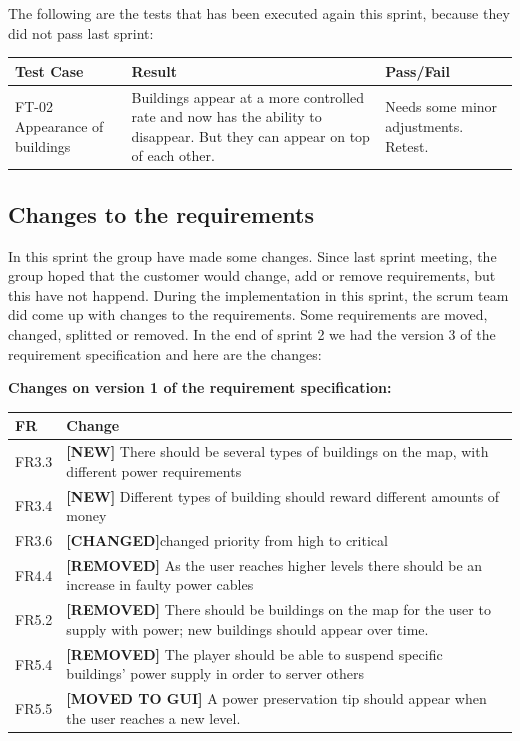 	The following are the tests that has been executed again this sprint, because they did not pass last sprint:

	\begin{tabular}{| p{2cm} | p{7cm} | p{3cm} |}
		\hline
		\rowcolor{lightgray}
		{\bf Test Case} & {\bf Result} & {\bf Pass/Fail} \\ \hline

		FT-02 Appearance of buildings & Buildings appear at a more controlled rate and now has the ability to disappear. But they can appear on top of each other. & Needs some minor adjustments. Retest. \\ \hline

	\end{tabular}

\subsection{Changes to the requirements}
	In this sprint the group have made some changes. Since last sprint meeting, 
	the group hoped that the customer would change, add or remove requirements, 
	but this have not happend. During the implementation in this sprint, the 
	scrum team did come up with changes to the requirements. 
	Some requirements are moved, changed, splitted or removed.
	In the end of sprint 2 we had the version 3 of the requirement specification 
	and here are the changes:


	{\bf Changes on version 1 of the requirement specification:} \\
	\begin{tabular}{| p{1.5cm} | p{12cm} |}
		\hline
		\rowcolor{lightgray}
		{\bf FR} & {\bf Change} \\ \hline
		FR3.3 & {\bf \color{green} [NEW]} There should be several types of buildings on the map, 
		with different power requirements  \\ \hline
		FR3.4 & {\bf \color{green} [NEW]} Different types of building should reward different amounts of 
		money \\ \hline
		FR3.6 & {\bf \color{orange} [CHANGED]}changed priority from high to critical \\ \hline
		FR4.4 & {\bf \color{red} [REMOVED]} As the user reaches higher levels there should be an 
		increase in faulty power cables \\ \hline
		FR5.2 & {\bf \color{red} [REMOVED]} There should be buildings on the map for the user to 
		supply with power; new buildings should appear over time. \\ \hline
		FR5.4 & {\bf \color{red} [REMOVED]} The player should be able to suspend specific buildings' 
		power supply in order to server others \\ \hline
		FR5.5 & {\bf \color{orange} [MOVED TO GUI]} A power preservation tip should appear when the 
		user reaches a new level. \\ \hline
	\end{tabular}

